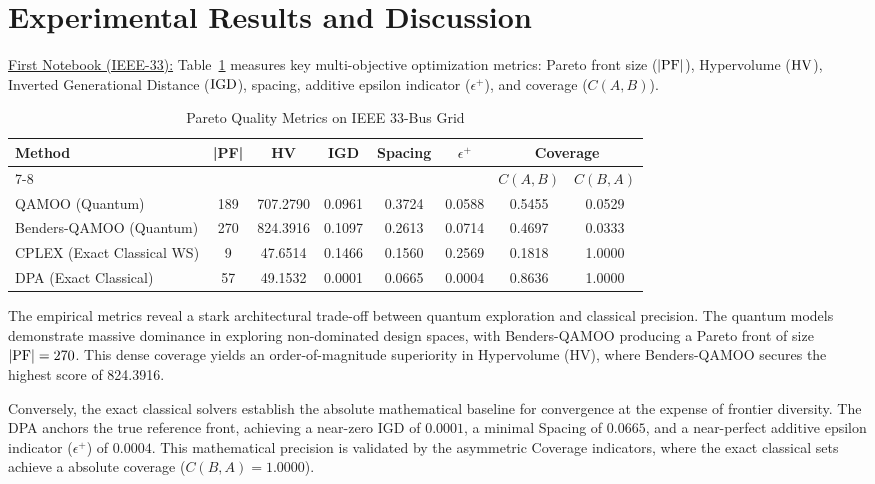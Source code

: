 \documentclass[11pt]{article}
\begin{document}
\section{Experimental Results and Discussion}
\underline{First Notebook (IEEE-33):} Table~\ref{tab:pareto-ieee33} measures key multi-objective optimization metrics: Pareto front size ($|{\rm PF}|$), Hypervolume (${\rm HV}$), Inverted Generational Distance (${\rm IGD}$), spacing, additive epsilon indicator ($\epsilon^+$), and coverage ($C(A,B)$).

\begin{table}[h!]
\centering
\caption{Pareto Quality Metrics on IEEE 33-Bus Grid}
\label{tab:pareto-ieee33}
\vspace{0.5em}
\begin{tabular}{lccccccc}
\toprule
\textbf{Method} & |\textbf{PF}| & \textbf{HV} & \textbf{IGD} & \textbf{Spacing} & $\epsilon^+$ & \multicolumn{2}{c}{\textbf{Coverage}} \\
\cmidrule(lr){7-8}
& & & & & & $C(A,B)$ & $C(B,A)$ \\
\midrule
QAMOO (Quantum)            & 189 & 707.2790 & 0.0961 & 0.3724 & 0.0588 & 0.5455 & 0.0529 \\
Benders-QAMOO (Quantum)    & 270 & 824.3916 & 0.1097 & 0.2613 & 0.0714 & 0.4697 & 0.0333 \\
CPLEX (Exact Classical WS) & 9   & 47.6514  & 0.1466 & 0.1560 & 0.2569 & 0.1818 & 1.0000 \\
DPA (Exact Classical)      & 57  & 49.1532  & 0.0001 & 0.0665 & 0.0004 & 0.8636 & 1.0000 \\
\bottomrule
\end{tabular}
\end{table}

The empirical metrics reveal a stark architectural trade-off between quantum exploration and classical precision. The quantum models demonstrate massive dominance in exploring non-dominated design spaces, with Benders-QAMOO producing a Pareto front of size $|{\rm PF}| = 270$. This dense coverage yields an order-of-magnitude superiority in Hypervolume (HV), where Benders-QAMOO secures the highest score of 824.3916.

Conversely, the exact classical solvers establish the absolute mathematical baseline for convergence at the expense of frontier diversity. The DPA anchors the true reference front, achieving a near-zero IGD of $0.0001$, a minimal Spacing of $0.0665$, and a near-perfect additive epsilon indicator ($\epsilon^+$) of $0.0004$. This mathematical precision is validated by the asymmetric Coverage indicators, where the exact classical sets achieve a absolute coverage ($C(B,A) = 1.0000$).
\end{document}
